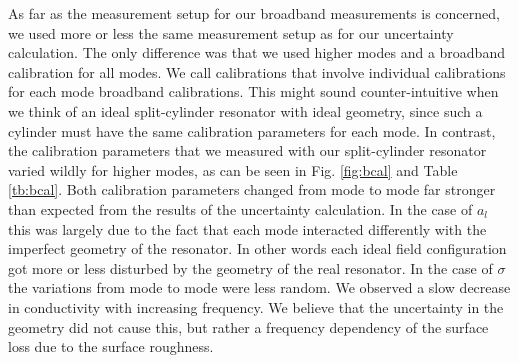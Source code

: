 As far as the measurement setup for our broadband measurements is concerned, we used more or less the same measurement setup as for our uncertainty calculation. The only difference was that we used higher modes and a broadband calibration for all modes. We call calibrations that involve individual calibrations for each mode broadband calibrations. This might sound counter-intuitive when we think of an ideal split-cylinder resonator with ideal geometry, since such a cylinder must have the same calibration parameters for each mode. In contrast, the calibration parameters that we measured with our split-cylinder resonator varied wildly for higher modes, as can be seen in Fig. \ref{fig:bcal} and Table \ref{tb:bcal}. Both calibration parameters changed from mode to mode far stronger than expected from the results of the uncertainty calculation. In the case of $a_l$ this was largely due to the fact that each mode interacted differently with the imperfect geometry of the resonator. In other words each ideal field configuration got more or less disturbed by the geometry of the real resonator. In the case of $\sigma$ the variations from mode to mode were less random. We observed a slow decrease in conductivity with increasing frequency. We believe that the uncertainty in the geometry did not cause this, but rather a frequency dependency of the surface loss due to the surface roughness.

